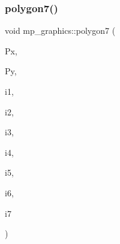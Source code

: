 \subsubsection{\texorpdfstring{polygon7()}{polygon7()}}
{\footnotesize\ttfamily void mp\+\_\+graphics\+::polygon7 (\begin{DoxyParamCaption}\item[{\mbox{\hyperlink{galois_8h_a09fddde158a3a20bd2dcadb609de11dc}{I\+NT}} $\ast$}]{Px,  }\item[{\mbox{\hyperlink{galois_8h_a09fddde158a3a20bd2dcadb609de11dc}{I\+NT}} $\ast$}]{Py,  }\item[{\mbox{\hyperlink{galois_8h_a09fddde158a3a20bd2dcadb609de11dc}{I\+NT}}}]{i1,  }\item[{\mbox{\hyperlink{galois_8h_a09fddde158a3a20bd2dcadb609de11dc}{I\+NT}}}]{i2,  }\item[{\mbox{\hyperlink{galois_8h_a09fddde158a3a20bd2dcadb609de11dc}{I\+NT}}}]{i3,  }\item[{\mbox{\hyperlink{galois_8h_a09fddde158a3a20bd2dcadb609de11dc}{I\+NT}}}]{i4,  }\item[{\mbox{\hyperlink{galois_8h_a09fddde158a3a20bd2dcadb609de11dc}{I\+NT}}}]{i5,  }\item[{\mbox{\hyperlink{galois_8h_a09fddde158a3a20bd2dcadb609de11dc}{I\+NT}}}]{i6,  }\item[{\mbox{\hyperlink{galois_8h_a09fddde158a3a20bd2dcadb609de11dc}{I\+NT}}}]{i7 }\end{DoxyParamCaption})}

\mbox{\label{classmp__graphics_a06abfea6f0d73fbab3f073985dc64e1e}} 
